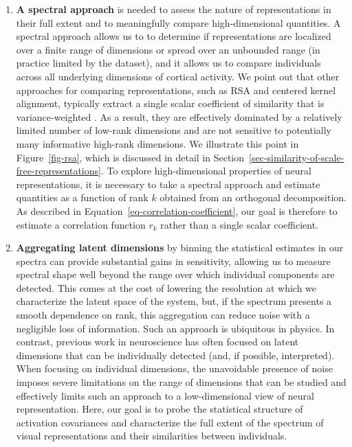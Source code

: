 \documentclass[10pt]{article}
\begin{document}
\begin{enumerate}
\def\labelenumi{\arabic{enumi}.}
\tightlist
\item
  \textbf{A spectral approach} is needed to assess the nature of
  representations in their full extent and to meaningfully compare
  high-dimensional quantities. A spectral approach allows us to to
  determine if representations are localized over a finite range of
  dimensions or spread over an unbounded range (in practice limited by
  the dataset), and it allows us to compare individuals across all
  underlying dimensions of cortical activity. We point out that other
  approaches for comparing representations, such as RSA and centered
  kernel alignment, typically extract a single scalar coefficient of
  similarity that is variance-weighted
  \autocite{Kriegeskorte2008,Kornblith2019}. As a result, they are
  effectively dominated by a relatively limited number of low-rank
  dimensions and are not sensitive to potentially many informative
  high-rank dimensions. We illustrate this point in
  Figure~\ref{fig-rsa}, which is discussed in detail in
  Section~\ref{sec-similarity-of-scale-free-representations}. To explore
  high-dimensional properties of neural representations, it is necessary
  to take a spectral approach and estimate quantities as a function of
  rank \(k\) obtained from an orthogonal decomposition. As described in
  Equation~\ref{eq-correlation-coefficient}, our goal is therefore to
  estimate a correlation function \(r_k\) rather than a single scalar
  coefficient.
\item
  \textbf{Aggregating latent dimensions} by binning the statistical
  estimates in our spectra can provide substantial gains in sensitivity,
  allowing us to measure spectral shape well beyond the range over which
  individual components are detected. This comes at the cost of lowering
  the resolution at which we characterize the latent space of the
  system, but, if the spectrum presents a smooth dependence on rank,
  this aggregation can reduce noise with a negligible loss of
  information. Such an approach is ubiquitous in physics. In contrast,
  previous work in neuroscience has often focused on latent dimensions
  that can be individually detected (and, if possible, interpreted).
  When focusing on individual dimensions, the unavoidable presence of
  noise imposes severe limitations on the range of dimensions that can
  be studied and effectively limits such an approach to a
  low-dimensional view of neural representation. Here, our goal is to
  probe the statistical structure of activation covariances and
  characterize the full extent of the spectrum of visual representations
  and their similarities between individuals.
\end{enumerate}
\end{document}
